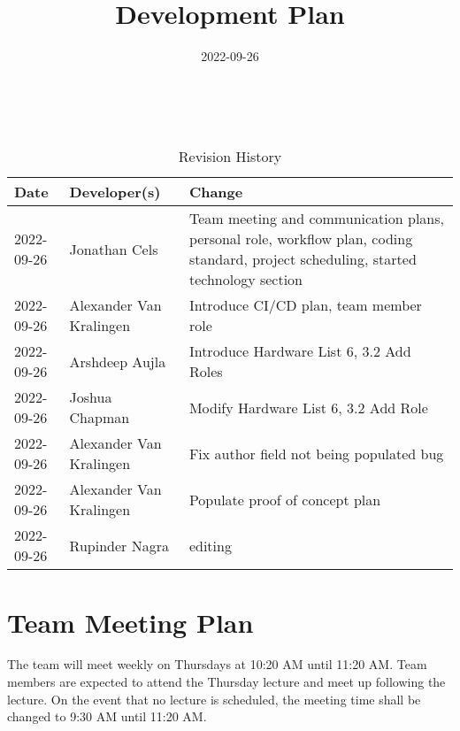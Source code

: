 \documentclass{article}
\title{Development Plan\\\progname}
\author{\authname}
\date{2022-09-26}
\begin{document}
\maketitle
\thispagestyle{empty}

~\newpage


\begin{table}[hp]
\caption{Revision History} \label{TblRevisionHistory}
\begin{tabularx}{\textwidth}{llX}
\toprule
\textbf{Date} & \textbf{Developer(s)} & \textbf{Change}\\
\midrule
2022-09-26 & Jonathan Cels & Team meeting and communication plans, personal role, workflow plan, coding standard, project scheduling, started technology section\\
2022-09-26 & Alexander Van Kralingen & Introduce CI/CD plan, team member role\\
2022-09-26 & Arshdeep Aujla & Introduce Hardware List 6, 3.2 Add Roles\\
2022-09-26 & Joshua Chapman & Modify Hardware List 6, 3.2 Add Role\\
2022-09-26 & Alexander Van Kralingen & Fix author field not being populated bug\\
2022-09-26 & Alexander Van Kralingen & Populate proof of concept plan\\
2022-09-26 & Rupinder Nagra & editing\\
\bottomrule
\end{tabularx}
\end{table}

\newpage

\maketitle

\section{Team Meeting Plan}
{The team will meet weekly on Thursdays at 10:20 AM until 11:20 AM. 
Team members are expected to attend the Thursday lecture and meet up following the lecture. 
On the event that no lecture is scheduled, the meeting time shall be changed to 9:30 AM until 11:20 AM.}

\medskip
{}
\end{document}
